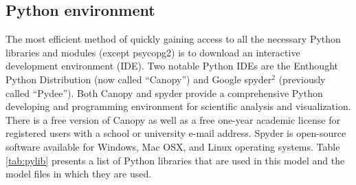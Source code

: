 \subsection{Python environment}
\label{sec:mespy}
The most efficient method of quickly gaining access to all the necessary Python libraries and modules (except psycopg2) is to download an interactive development environment (IDE).  
Two notable Python IDEs are the Enthought Python Distribution\footnotemark {} (now called ``Canopy'') and Google spyder$^{2}$\footnotemark {} (previously called ``Pydee'').  
Both Canopy and spyder provide a comprehensive Python developing and programming environment for scientific analysis and visualization.  
There is a free version of Canopy as well as a free one-year academic license for registered users with a school or university e-mail address. 
Spyder is open-source software available for Windows, Mac OSX, and Linux operating systems.  
Table \ref{tab:pylib} presents a list of Python libraries that are used in this model and the model files in which they are used.

